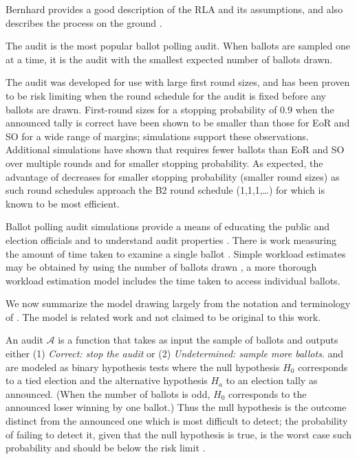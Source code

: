 Bernhard provides a good description of the RLA and its assumptions, and also describes the process on the ground \cite{bernhard-sok}. 

The \BRAVO audit \cite{bravo} is the most popular ballot polling audit. When ballots are sampled one at a time, it is the audit with the smallest expected number of ballots drawn. 

The \Minerva audit \cite{usenix_minerva,arxiv_athena} was developed for use with large first round sizes, and has been proven to be risk limiting when the round schedule for the audit is fixed before any ballots are drawn. First-round sizes for a stopping probability of $0.9$ when the announced tally is correct have been shown to be smaller than those for EoR and SO \BRAVO for a wide range of margins; simulations \cite{arxiv_athena} support these observations. Additional simulations \cite{simulations} have shown that \Minerva requires fewer ballots than EoR and SO \BRAVO over multiple rounds and for smaller stopping probability. As expected, the advantage of \Minerva decreases for smaller stopping probability (smaller round sizes) as such round schedules approach the B2 round schedule (1,1,1,\ldots) for which \BRAVO is known to be most efficient.

Ballot polling audit simulations provide a means of educating the public and election officials \cite{dice} and to understand audit properties \cite{mclaughlin_thesis,simulations_house, blom_IRV, DBLP:conf/evoteid/HuangRSTV20}. There is work measuring the amount of time taken to examine a single ballot \cite{RI-report}. 
Simple workload estimates may be obtained by using the number of ballots drawn \cite{bernoulli-ballot-polling}, a more thorough workload estimation model includes the time taken to access individual ballots\cite{bernhard-diss}. 

We now summarize the model drawing largely from the notation and terminology of \cite{usenix_minerva,arxiv_athena,simulations,bravo}. The model is related work and not claimed to be original to this work. 

An audit $\mathcal{A}$ is a function that takes as input the sample of ballots and outputs either (1) \emph{Correct: stop the audit} or (2) \emph{Undetermined: sample more ballots}.
\BRAVO and \Minerva are modeled as binary hypothesis tests where the null hypothesis $H_0$ corresponds to a tied election and the alternative hypothesis $H_a$ to an election tally as announced. 
(When the number of ballots is odd, $H_0$ corresponds to the announced loser winning by one ballot.)
Thus the null hypothesis is the outcome distinct from the announced one which is most difficult to detect; the probability of failing to detect it, given that the null hypothesis is true, is the worst case such probability and should be below the risk limit \cite{Bayesian-RLA}.

